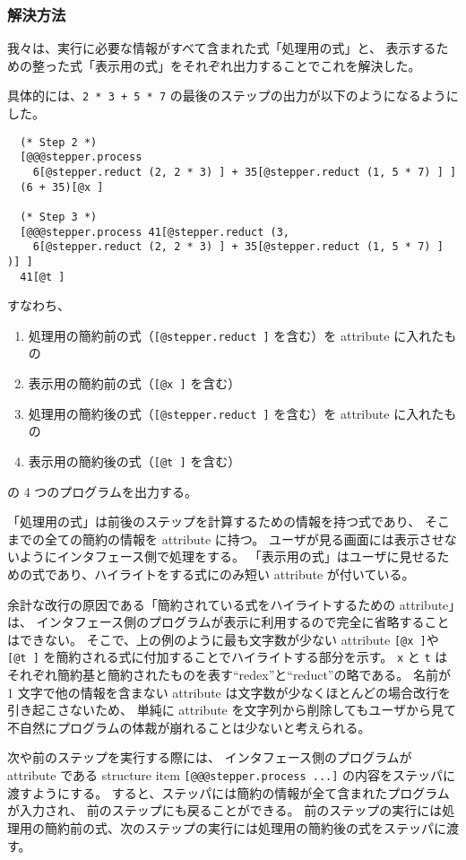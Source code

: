 \subsubsection{解決方法}
\label{生じた問題と解決方法-表示の崩れ-解決方法}
我々は、実行に必要な情報がすべて含まれた式「処理用の式」と、
表示するための整った式「表示用の式」をそれぞれ出力することでこれを解決した。

具体的には、\texttt{2 * 3 + 5 * 7} の最後のステップの出力が以下のようになるようにした。
\begin{verbatim}
  (* Step 2 *)
  [@@@stepper.process
    6[@stepper.reduct (2, 2 * 3) ] + 35[@stepper.reduct (1, 5 * 7) ] ]
  (6 + 35)[@x ]

  (* Step 3 *)
  [@@@stepper.process 41[@stepper.reduct (3,
    6[@stepper.reduct (2, 2 * 3) ] + 35[@stepper.reduct (1, 5 * 7) ] )] ]
  41[@t ]
\end{verbatim}
すなわち、
\begin{enumerate}
\item 処理用の簡約前の式（\texttt{[@stepper.reduct ]} を含む）を attribute に入れたもの
\item 表示用の簡約前の式（\texttt{[@x ]} を含む）
\item 処理用の簡約後の式（\texttt{[@stepper.reduct ]} を含む）を attribute に入れたもの
\item 表示用の簡約後の式（\texttt{[@t ]} を含む）
\end{enumerate}
の 4 つのプログラムを出力する。

「処理用の式」は前後のステップを計算するための情報を持つ式であり、
そこまでの全ての簡約の情報を attribute に持つ。
ユーザが見る画面には表示させないようにインタフェース側で処理をする。
「表示用の式」はユーザに見せるための式であり、ハイライトをする式にのみ短い attribute が付いている。

余計な改行の原因である「簡約されている式をハイライトするための attribute」は、
インタフェース側のプログラムが表示に利用するので完全に省略することはできない。
そこで、上の例のように最も文字数が少ない attribute \texttt{[@x ]}や \texttt{[@t ]}
を簡約される式に付加することでハイライトする部分を示す。
\texttt{x} と \texttt{t} はそれぞれ簡約基と簡約されたものを表す``redex''と``reduct''の略である。
名前が 1 文字で他の情報を含まない attribute は文字数が少なくほとんどの場合改行を引き起こさないため、
単純に attribute を文字列から削除してもユーザから見て不自然にプログラムの体裁が崩れることは少ないと考えられる。

次や前のステップを実行する際には、
インタフェース側のプログラムが attribute である structure item
\texttt{[@@@stepper.process ...]} の内容をステッパに渡すようにする。
すると、ステッパには簡約の情報が全て含まれたプログラムが入力され、
前のステップにも戻ることができる。
前のステップの実行には処理用の簡約前の式、次のステップの実行には処理用の簡約後の式をステッパに渡す。
